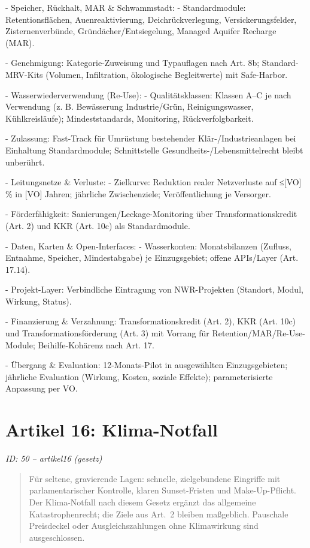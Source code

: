 \documentclass[12pt,a4paper]{scrartcl}
\begin{document}
- Speicher, Rückhalt, MAR \& Schwammstadt:
- Standardmodule: Retentionsflächen, Auenreaktivierung, Deichrückverlegung, Versickerungsfelder, Zisternenverbünde, Gründächer/Entsiegelung, Managed Aquifer Recharge (MAR).

- Genehmigung: Kategorie-Zuweisung und Typauflagen nach Art. 8b; Standard-MRV-Kits (Volumen, Infiltration, ökologische Begleitwerte) mit Safe-Harbor.

- Wasserwiederverwendung (Re-Use):
- Qualitätsklassen: Klassen A--C je nach Verwendung (z. B. Bewässerung Industrie/Grün, Reinigungswasser, Kühlkreisläufe); Mindeststandards, Monitoring, Rückverfolgbarkeit.

- Zulassung: Fast-Track für Umrüstung bestehender Klär-/Industrieanlagen bei Einhaltung Standardmodule; Schnittstelle Gesundheits-/Lebensmittelrecht bleibt unberührt.

- Leitungsnetze \& Verluste:
- Zielkurve: Reduktion realer Netzverluste auf ≤[VO] \% in [VO] Jahren; jährliche Zwischenziele; Veröffentlichung je Versorger.

- Förderfähigkeit: Sanierungen/Leckage-Monitoring über Transformationskredit (Art. 2) und KKR (Art. 10c) als Standardmodule.

- Daten, Karten \& Open-Interfaces:
- Wasserkonten: Monatsbilanzen (Zufluss, Entnahme, Speicher, Mindestabgabe) je Einzugsgebiet; offene APIs/Layer (Art. 17.14).

- Projekt-Layer: Verbindliche Eintragung von NWR-Projekten (Standort, Modul, Wirkung, Status).

- Finanzierung \& Verzahnung: Transformationskredit (Art. 2), KKR (Art. 10c) und Transformationsförderung (Art. 3) mit Vorrang für Retention/MAR/Re-Use-Module; Beihilfe-Kohärenz nach Art. 17.

- Übergang \& Evaluation: 12-Monats-Pilot in ausgewählten Einzugsgebieten; jährliche Evaluation (Wirkung, Kosten, soziale Effekte); parameterisierte Anpassung per VO.


\section[Artikel 16: Klima-Notfall]{Artikel 16: Klima-Notfall}
\noindent\textit{ID: 50 -- artikel16 (gesetz)}

\begin{quote}
Für seltene, gravierende Lagen: schnelle, zielgebundene Eingriffe mit parlamentarischer Kontrolle, klaren Sunset-Fristen und Make-Up-Pflicht. Der Klima-Notfall nach diesem Gesetz ergänzt das allgemeine Katastrophenrecht; die Ziele aus Art. 2 bleiben maßgeblich. Pauschale Preisdeckel oder Ausgleichszahlungen ohne Klimawirkung sind ausgeschlossen.
\end{quote}
\end{document}
